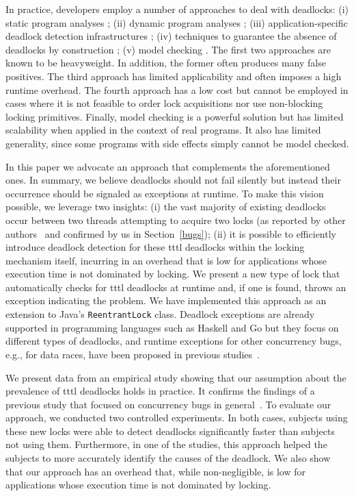 In practice, developers employ a number of approaches to deal with deadlocks:
(i) static program analyses \citep{marino}\citep{dawson}\citep{vivek}\citep{williams};
(ii) dynamic program analyses \citep{mcsdk}\citep{magicfuzzer}\citep{sammati}\citep{serenity}\citep{pyla}\citep{rx};
(iii) application-specific deadlock detection infrastructu\-res \citep{orderedlock};
(iv) techniques to guarantee the absence of deadlocks by construction \citep{marino};
(v) model checking \citep{havelund}.
The first two approaches are known to be heavyweight. In addition, the former often produces many false positives.
The third approach has limited applicability and often imposes a high runtime overhead.
The fourth approach has a low cost but cannot be employed in cases where it is not feasible to order lock acquisitions nor use non-blocking locking primitives.
Finally, model checking is a powerful solution but has limited scalability when applied in the context of real programs. It also has limited generality, since some programs with side effects simply cannot be model checked.

In this paper we advocate an approach that complements the aforementioned ones.
In summary, we believe deadlocks should not fail silently but instead their occurrence should be signaled as exceptions at runtime.
To make this vision possible, we leverage two insights:
(i) the vast majority of existing deadlocks occur between two threads attempting to acquire two locks (as reported by other authors~\citep{lu} and confirmed by us in Section~\ref{bugs});
(ii) it is possible to efficiently introduce deadlock detection for these \ac{tttl} deadlocks within the locking mechanism itself, incurring in an overhead that is low for applications whose execution time is not dominated by locking.
We present a new type of lock that automatically checks for \ac{tttl} deadlocks at runtime and, if one is found, throws an exception indicating the problem.
We have implemented this approach as an extension to Java's {\tt ReentrantLock} class.
Deadlock exceptions are already supported in programming languages such as Haskell \citep{marlow} and Go \citep{golang} but they focus on different types of deadlocks, and runtime exceptions for other concurrency bugs, e.g., for data races, have been proposed in previous studies~\citep{valor}.

We present data from an empirical study showing that our assumption about the prevalence of \ac{tttl} deadlocks holds in practice. It confirms the findings of a previous study that focused on concurrency bugs in general~\citep{lu}. 
To evaluate our approach, we conducted two controlled experiments. In both cases, subjects using these new locks were able to detect deadlocks significantly faster than subjects not using them.  Furthermore, in one of the studies, this approach helped the subjects to more accurately identify the causes of the deadlock. We also show that our approach has an overhead that, while non-negligible, is low for applications whose execution time is not dominated by locking.


